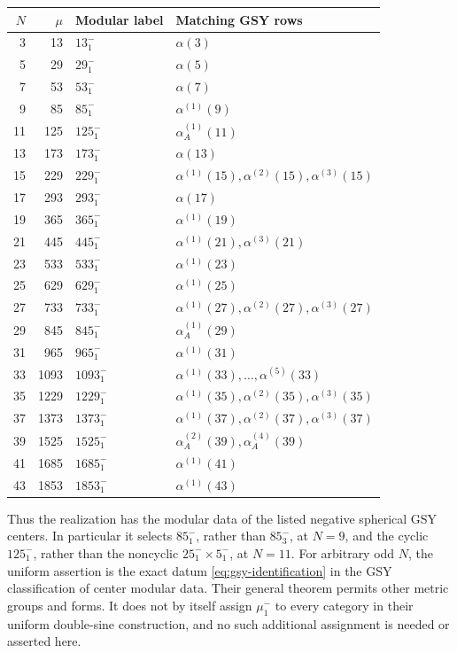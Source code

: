 \documentclass[11pt,a4paper]{article}
\numberwithin{equation}{section}
\theoremstyle{definition}\newtheorem{definition}[theorem]{Definition}
\theoremstyle{remark}\newtheorem{remark}[theorem]{Remark}
\begin{document}
\begin{center}
\small
\begin{tabular}{@{}rrll@{}}
\toprule
$N$ & $\mu$ & Modular label & Matching GSY rows\\
\midrule
3 & 13 & $13^-_1$ & $\alpha(3)$\\
5 & 29 & $29^-_1$ & $\alpha(5)$\\
7 & 53 & $53^-_1$ & $\alpha(7)$\\
9 & 85 & $85^-_1$ & $\alpha^{(1)}(9)$\\
11 & 125 & $125^-_1$ & $\alpha_A^{(1)}(11)$\\
13 & 173 & $173^-_1$ & $\alpha(13)$\\
15 & 229 & $229^-_1$ & $\alpha^{(1)}(15),\alpha^{(2)}(15),\alpha^{(3)}(15)$\\
17 & 293 & $293^-_1$ & $\alpha(17)$\\
19 & 365 & $365^-_1$ & $\alpha^{(1)}(19)$\\
21 & 445 & $445^-_1$ & $\alpha^{(1)}(21),\alpha^{(3)}(21)$\\
23 & 533 & $533^-_1$ & $\alpha^{(1)}(23)$\\
25 & 629 & $629^-_1$ & $\alpha^{(1)}(25)$\\
27 & 733 & $733^-_1$ & $\alpha^{(1)}(27),\alpha^{(2)}(27),\alpha^{(3)}(27)$\\
29 & 845 & $845^-_1$ & $\alpha_A^{(1)}(29)$\\
31 & 965 & $965^-_1$ & $\alpha^{(1)}(31)$\\
33 & 1093 & $1093^-_1$ & $\alpha^{(1)}(33),\ldots,\alpha^{(5)}(33)$\\
35 & 1229 & $1229^-_1$ & $\alpha^{(1)}(35),\alpha^{(2)}(35),\alpha^{(3)}(35)$\\
37 & 1373 & $1373^-_1$ & $\alpha^{(1)}(37),\alpha^{(2)}(37),\alpha^{(3)}(37)$\\
39 & 1525 & $1525^-_1$ & $\alpha_A^{(2)}(39),\alpha_A^{(4)}(39)$\\
41 & 1685 & $1685^-_1$ & $\alpha^{(1)}(41)$\\
43 & 1853 & $1853^-_1$ & $\alpha^{(1)}(43)$\\
\bottomrule
\end{tabular}
\end{center}

Thus the realization has the modular data of the listed negative
spherical GSY centers. In particular it selects $85^-_1$, rather
than $85^-_3$, at $N=9$, and the cyclic $125^-_1$, rather than the
noncyclic $25^-_1\times5^-_1$, at $N=11$.
For arbitrary odd $N$, the uniform assertion is the exact datum
\eqref{eq:gsy-identification} in the GSY classification of center
modular data. Their general theorem permits other metric groups
and forms. It does not by itself assign $\mu^-_1$ to every category
in their uniform double-sine construction, and no such additional
assignment is needed or asserted here.
\end{document}
